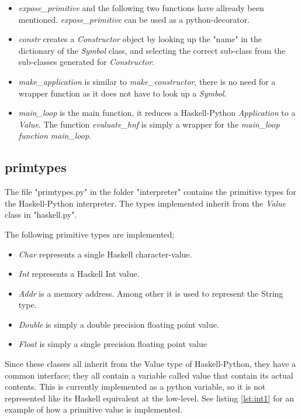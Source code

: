 \begin{itemize}

\item \emph{expose\_primitive} and the following two functions have allready been 
mentioned. \emph{expose\_primitive} can be used as a python-decorator.

\item \emph{constr} creates a \emph{Constructor} object by looking up the "name" in
the dictionary of the \emph{Symbol} class, and selecting the correct sub-class from the
sub-classes generated for \emph{Constructor}.

\item \emph{make\_application} is similar to \emph{make\_constructor}, there is no
need for a wrapper function as it does not have to look up a \emph{Symbol}.

\item \emph{main\_loop} is the main function, it reduces a Haskell-Python 
\emph{Application} to a \emph{Value}. The function \emph{evaluate\_hnf} is
simply a wrapper for the \emph{main\_loop function}
\emph{main\_loop}.

\end{itemize}

\subsection{primtypes}

The file "primtypes.py" in the folder "interpreter" contains the primitive types
for the Haskell-Python interpreter. The types implemented inherit from the
\emph{Value} class in "haskell.py".

The following primitive types are implemented;

\begin{itemize}
\item \emph{Char} represents a single Haskell character-value.
\item \emph{Int} represents a Haskell Int value.
\item \emph{Addr} is a memory address. Among other it is used to represent
the String type.

\item \emph{Double} is simply a double precision floating point value.
\item \emph{Float} is simply a single precision floating point value
\end{itemize}

Since these classes all inherit from the Value type of Haskell-Python, 
they have a common interface; they all contain a variable called value that
contain its actual contents. This is currently implemented as a python
variable, so it is not represented like its Haskell equivalent at the low-level.
See listing \ref{lst:int1} for an example of how a primitive value is implemented.

